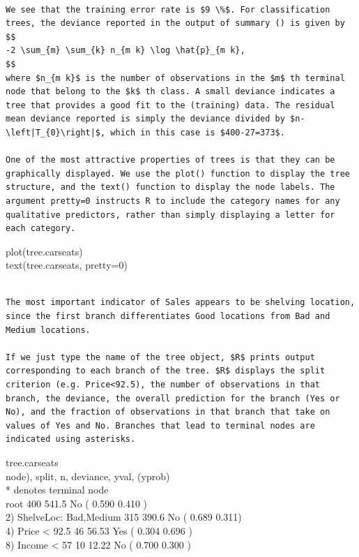 \documentclass[10pt]{article}
\begin{document}
\begin{verbatim}

We see that the training error rate is $9 \%$. For classification trees, the deviance reported in the output of summary () is given by
$$
-2 \sum_{m} \sum_{k} n_{m k} \log \hat{p}_{m k},
$$
where $n_{m k}$ is the number of observations in the $m$ th terminal node that belong to the $k$ th class. A small deviance indicates a tree that provides a good fit to the (training) data. The residual mean deviance reported is simply the deviance divided by $n-\left|T_{0}\right|$, which in this case is $400-27=373$.

One of the most attractive properties of trees is that they can be graphically displayed. We use the plot() function to display the tree structure, and the text() function to display the node labels. The argument pretty=0 instructs R to include the category names for any qualitative predictors, rather than simply displaying a letter for each category.
\end{verbatim}

\begin{displayquote}
plot(tree.carseats)\\
text(tree.carseats, pretty=0)
\end{displayquote}

\begin{verbatim}

The most important indicator of Sales appears to be shelving location, since the first branch differentiates Good locations from Bad and Medium locations.

If we just type the name of the tree object, $R$ prints output corresponding to each branch of the tree. $R$ displays the split criterion (e.g. Price<92.5), the number of observations in that branch, the deviance, the overall prediction for the branch (Yes or No), and the fraction of observations in that branch that take on values of Yes and No. Branches that lead to terminal nodes are indicated using asterisks.
\end{verbatim}

\begin{displayquote}
tree.carseats\\
node), split, n, deviance, yval, (yprob)\\
* denotes terminal node\\
root 400 541.5 No ( 0.590 0.410 )\\
2) ShelveLoc: Bad,Medium 315 390.6 No ( 0.689 0.311)\\
4) Price < 92.5 46 56.53 Yes ( 0.304 0.696 )\\
8) Income < 57 10 12.22 No ( 0.700 0.300 )
\end{displayquote}
\end{document}
